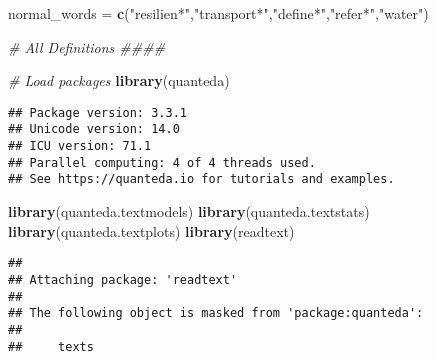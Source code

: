 \documentclass[
]{article}
\newenvironment{Shaded}{\begin{snugshade}}{\end{snugshade}}
\newcommand{\CommentTok}[1]{\textcolor[rgb]{0.56,0.35,0.01}{\textit{#1}}}
\newcommand{\FunctionTok}[1]{\textcolor[rgb]{0.13,0.29,0.53}{\textbf{#1}}}
\newcommand{\NormalTok}[1]{#1}
\newcommand{\OtherTok}[1]{\textcolor[rgb]{0.56,0.35,0.01}{#1}}
\newcommand{\StringTok}[1]{\textcolor[rgb]{0.31,0.60,0.02}{#1}}
\begin{document}
\begin{Shaded}
\begin{Highlighting}[]
\NormalTok{normal\_words }\OtherTok{=} \FunctionTok{c}\NormalTok{(}\StringTok{"resilien*"}\NormalTok{,}\StringTok{"transport*"}\NormalTok{,}\StringTok{"define*"}\NormalTok{,}\StringTok{"refer*"}\NormalTok{,}\StringTok{"water"}\NormalTok{)}

\CommentTok{\# All Definitions \#\#\#\#}

\CommentTok{\# Load packages}
\FunctionTok{library}\NormalTok{(quanteda)}
\end{Highlighting}
\end{Shaded}

\begin{verbatim}
## Package version: 3.3.1
## Unicode version: 14.0
## ICU version: 71.1
## Parallel computing: 4 of 4 threads used.
## See https://quanteda.io for tutorials and examples.
\end{verbatim}

\begin{Shaded}
\begin{Highlighting}[]
\FunctionTok{library}\NormalTok{(quanteda.textmodels)}
\FunctionTok{library}\NormalTok{(quanteda.textstats)}
\FunctionTok{library}\NormalTok{(quanteda.textplots)}
\FunctionTok{library}\NormalTok{(readtext)}
\end{Highlighting}
\end{Shaded}

\begin{verbatim}
## 
## Attaching package: 'readtext'
## 
## The following object is masked from 'package:quanteda':
## 
##     texts
\end{verbatim}
\end{document}
